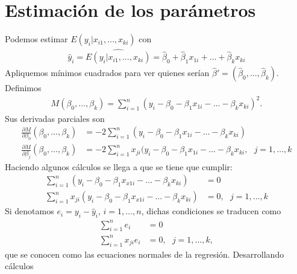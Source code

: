 \section{Estimación de los parámetros}
Podemos estimar $E(y_i | x_{i1},\ldots,x_{ki})$ con
\begin{align*}
    \widehat{y}_i = \widehat{E(y_i | x_{i1},\ldots,x_{ki})} = \widehat{\beta}_0 + \widehat{\beta}_1 x_{1i} + \ldots + \widehat{\beta}_k x_{ki}
\end{align*}
Apliquemos mínimos cuadrados para ver quienes serían $\widehat{\beta}' = (\widehat{\beta}_0,\ldots,\widehat{\beta}_k)$. Definimos
\begin{align*}
    M(\beta_0,\ldots,\beta_k) = \sum_{i=1}^{n} (y_i - \beta_0 - \beta_1 x_{1i} - \ldots - \beta_k x_{ki})^2.
\end{align*}
Sus derivadas parciales son
\begin{align*}
    \frac{\partial M}{\partial \beta_0} (\beta_0,\ldots,\beta_k) & = -2 \sum_{i=1}^{n} (y_i - \beta_0 - \beta_1 x_{1i} - \ldots - \beta_k x_{ki})                            \\
    \frac{\partial M}{\partial \beta_j} (\beta_0,\ldots,\beta_k) & = -2\sum_{i=1}^{n} x_{ji} (y_i - \beta_0 - \beta_1 x_{1i} - \ldots - \beta_k x_{ki}, \ \ \ j = 1,\ldots,k
\end{align*}
Haciendo algunos cálculos se llega a que se tiene que cumplir:
\begin{align*}
    \sum_{i=1}^{n} (y_i - \beta_0 - \beta_1 x_{x1i} - \ldots - \beta_k x_{ki})        & = 0                       \\
    \sum_{i=1}^{n} x_{ji} (y_i - \beta_0 - \beta_1 x_{x1i} - \ldots - \beta_k x_{ki}) & = 0, \ \ \ j = 1,\ldots,k
\end{align*}
Si denotamos $e_i = y_i - \widehat{y}_i$, $i = 1,\ldots,n$, dichas condiciones se traducen como
\begin{align*}
    \sum_{i=1}^{n} e_i        & = 0                       \\
    \sum_{i=1}^{n} x_{ji} e_i & =0, \ \ \ j = 1,\ldots,k,
\end{align*}
que se conocen como las ecuaciones normales de la regresión. Desarrollando cálculos

